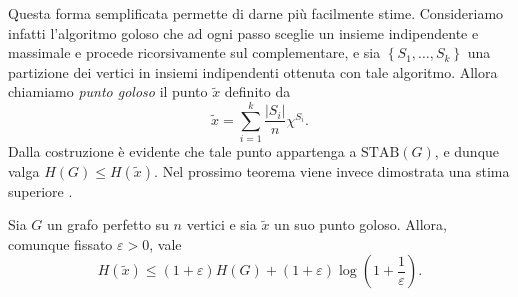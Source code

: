 Questa forma semplificata permette di darne più facilmente stime. Consideriamo infatti l'algoritmo goloso che ad ogni passo sceglie un insieme indipendente e massimale e procede ricorsivamente sul complementare, e sia \(\left\{S_1,\dots,S_k\right\}\) una partizione dei vertici in insiemi indipendenti ottenuta con tale algoritmo. Allora chiamiamo \emph{punto goloso} il punto \(\tilde{x}\) definito da
\[
\tilde{x}=\sum_{i=1}^k\frac{|S_i|}{n}\chi^{S_i}\text{.}
\]
Dalla costruzione è evidente che tale punto appartenga a \(\text{STAB}(G)\), e dunque valga \(H(G)\le H(\tilde{x})\). Nel prossimo teorema viene invece dimostrata una stima superiore \cite{Cardinal2009}.
\begin{theorem}
   \label{greedypoint} Sia \(G\) un grafo perfetto su \(n\) vertici e sia \(\tilde{x}\) un suo punto goloso. Allora, comunque fissato \(\varepsilon>0\), vale
  \[H(\tilde{x})\le(1+\varepsilon)H(G)+(1+\varepsilon)\log\left(1+\frac{1}{\varepsilon}\right).\]
\end{theorem}
